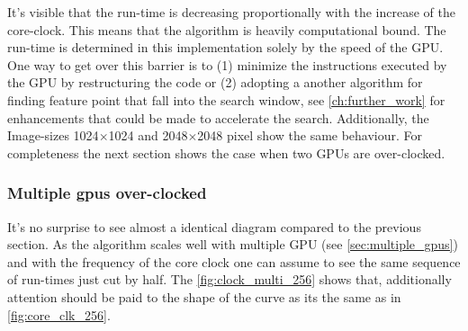 It's visible that the run-time is decreasing proportionally with the increase of
the core-clock. This means that the algorithm is heavily computational bound.
The run-time is determined in this implementation solely by the speed of the
\gls{GPU}. One way to get over this barrier is to (1) minimize the instructions
executed by the \gls{GPU} by restructuring the code or (2) adopting a another
algorithm for finding feature point that fall into the search window, see
\autoref{ch:further_work} for enhancements that could be made to accelerate the
search. Additionally, the Image-sizes 1024$\times$1024 and 2048$\times$2048
pixel show the same behaviour.
For completeness the next section shows the case when two \glspl{GPU} are 
over-clocked.

\subsubsection{Multiple gpus over-clocked} %
\label{ssub:multiple_gpus_overclocked}
It's no surprise to see almost a identical diagram compared to the previous
section. As the algorithm scales well with multiple \gls{GPU} (see
\autoref{sec:multiple_gpus}) and with the frequency of the core clock one can 
assume to see the same sequence of run-times just cut by half. The
\autoref{fig:clock_multi_256} shows that, additionally attention should be paid
to the shape of the curve as its the same as in \autoref{fig:core_clk_256}. 

